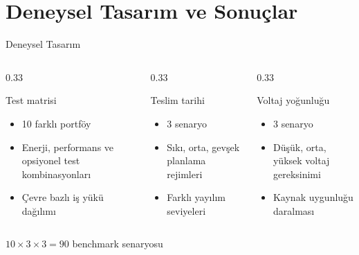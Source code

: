 \documentclass[aspectratio=169,11pt]{beamer}
\begin{document}
\section{Deneysel Tasarım ve Sonuçlar}

\begin{frame}{Deneysel Tasarım}
  \begin{columns}[T,totalwidth=\textwidth]
    \begin{column}{0.33\textwidth}
      \begin{block}{Test matrisi}
        \begin{itemize}
          \item 10 farklı portföy
          \item Enerji, performans ve opsiyonel test kombinasyonları
          \item Çevre bazlı iş yükü dağılımı
        \end{itemize}
      \end{block}
    \end{column}
    \begin{column}{0.33\textwidth}
      \begin{block}{Teslim tarihi}
        \begin{itemize}
          \item 3 senaryo
          \item Sıkı, orta, gevşek planlama rejimleri
          \item Farklı yayılım seviyeleri
        \end{itemize}
      \end{block}
    \end{column}
    \begin{column}{0.33\textwidth}
      \begin{block}{Voltaj yoğunluğu}
        \begin{itemize}
          \item 3 senaryo
          \item Düşük, orta, yüksek voltaj gereksinimi
          \item Kaynak uygunluğu daralması
        \end{itemize}
      \end{block}
    \end{column}
  \end{columns}

  \vspace{3mm}
  \begin{center}
    \Large
    $10 \times 3 \times 3 = 90$ benchmark senaryosu
  \end{center}
\end{frame}
\end{document}
